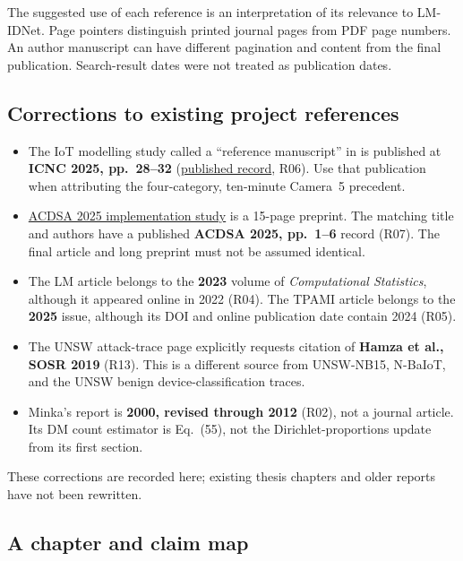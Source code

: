 \documentclass[11pt,a4paper]{article}
\begin{document}
The suggested use of each reference is an interpretation of its relevance to
LM-IDNet. Page pointers distinguish printed journal pages from PDF page numbers.
An author manuscript can have different pagination and content from the final
publication. Search-result dates were not treated as publication dates.

\subsection{Corrections to existing project references}

\begin{itemize}
\item The IoT modelling study called a ``reference manuscript'' in
   is published at
  \textbf{ICNC 2025, pp.~28--32}
  (\href{https://doi.org/10.1109/ICNC64010.2025.10993688}{published record}, R06).
  Use that publication when attributing the four-category,
  ten-minute Camera~5 precedent.
\item \href{https://doi.org/10.1109/ACDSA65407.2025.11166588}{ACDSA 2025 implementation study} is a 15-page preprint. The matching title and
  authors have a published \textbf{ACDSA 2025, pp.~1--6} record (R07).
  The final article and long preprint must not be assumed identical.
\item The LM article belongs to the \textbf{2023} volume of
  \emph{Computational Statistics}, although it appeared online in 2022 (R04).
  The TPAMI article belongs to the \textbf{2025} issue, although its DOI and
  online publication date contain 2024 (R05).
\item The UNSW attack-trace page explicitly requests citation of
  \textbf{Hamza et al., SOSR 2019} (R13). This is a different source from
  UNSW-NB15, N-BaIoT, and the UNSW benign device-classification traces.
\item Minka's report is \textbf{2000, revised through 2012} (R02), not a journal
  article. Its DM count estimator is Eq.~(55), not the Dirichlet-proportions
  update from its first section.
\end{itemize}

These corrections are recorded here; existing thesis chapters and older reports
have not been rewritten.

\subsection{A chapter and claim map}
\end{document}
